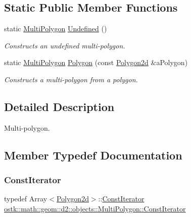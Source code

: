 \subsection*{Static Public Member Functions}
\begin{DoxyCompactItemize}
\item 
static \hyperlink{classostk_1_1math_1_1geom_1_1d2_1_1objects_1_1_multi_polygon}{Multi\+Polygon} \hyperlink{classostk_1_1math_1_1geom_1_1d2_1_1objects_1_1_multi_polygon_aa80a7642515417486bb846f869120fcd}{Undefined} ()
\begin{DoxyCompactList}\small\item\em Constructs an undefined multi-\/polygon. \end{DoxyCompactList}\item 
static \hyperlink{classostk_1_1math_1_1geom_1_1d2_1_1objects_1_1_multi_polygon}{Multi\+Polygon} \hyperlink{classostk_1_1math_1_1geom_1_1d2_1_1objects_1_1_multi_polygon_acbc10ee102e1a22862ec02842fff0506}{Polygon} (const \hyperlink{namespaceostk_1_1math_1_1geom_1_1d2_1_1objects_a5786a3021d23f9c64937e263a2da9d27}{Polygon2d} \&a\+Polygon)
\begin{DoxyCompactList}\small\item\em Constructs a multi-\/polygon from a polygon. \end{DoxyCompactList}\end{DoxyCompactItemize}


\subsection{Detailed Description}
Multi-\/polygon. 

\subsection{Member Typedef Documentation}
\mbox{\label{classostk_1_1math_1_1geom_1_1d2_1_1objects_1_1_multi_polygon_ade3439a576f75f37a3ebf8b4e195bad5}} 
\subsubsection{\texorpdfstring{Const\+Iterator}{ConstIterator}}
{\footnotesize\ttfamily typedef Array$<$\hyperlink{namespaceostk_1_1math_1_1geom_1_1d2_1_1objects_a5786a3021d23f9c64937e263a2da9d27}{Polygon2d}$>$\+::\hyperlink{classostk_1_1math_1_1geom_1_1d2_1_1objects_1_1_multi_polygon_ade3439a576f75f37a3ebf8b4e195bad5}{Const\+Iterator} \hyperlink{classostk_1_1math_1_1geom_1_1d2_1_1objects_1_1_multi_polygon_ade3439a576f75f37a3ebf8b4e195bad5}{ostk\+::math\+::geom\+::d2\+::objects\+::\+Multi\+Polygon\+::\+Const\+Iterator}}




